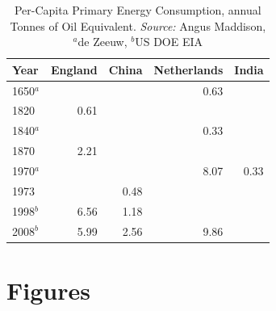 \documentclass[12pt]{article}
\numberwithin{equation}{section}
\begin{document}
\begin{table}[htb]
	\centering
	

	\begin{tabular}{lrrrr}
	\hline
	Year&England&China&Netherlands&India\\
	\hline \hline
	1650$^a$&&&0.63&  \\
	1820&0.61&&&\\
	1840$^a$ &&&0.33& \\
	1870&2.21&\\
	1970$^a$ &&&8.07&0.33 \\
	1973&&0.48&&\\
	1998$^b$&6.56&1.18\\
	2008$^b$&5.99&2.56&9.86&  \\
	\hline
	\end{tabular}
	\caption{Per-Capita Primary Energy Consumption,	annual Tonnes of Oil Equivalent. \textit{Source:} Angus Maddison, $^a$de Zeeuw, $^b$US DOE EIA}
	\label{tab:maddison_energy}

	\end{table}



\newpage
\section*{Figures}
\end{document}
